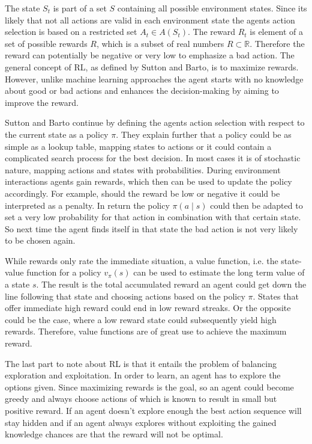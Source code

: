 The state $S_t$ is part of a set $S$ containing all possible environment states.
Since its likely that not all actions are valid in each environment state
the agents action selection is based on a restricted set $A_t\in A(S_t)$.
The reward $R_t$ is element of a set of possible rewards $R$, which is a subset of real
numbers $R \subset \mathbb{R}$. Therefore the reward can potentially be negative or very
low to emphasize a bad action. The general concept of RL, as defined by Sutton and
Barto, is to maximize rewards. However, unlike machine learning approaches
the agent starts with no knowledge about good or bad actions and enhances the
decision-making by aiming to improve the reward.

Sutton and Barto continue by defining the agents action selection with
respect to the current state as a policy $\pi$.
They explain further that a policy could be as simple as a lookup table, mapping
states to actions or it could contain a complicated search process for the best
decision. In most cases it is of stochastic nature, mapping actions and states with
probabilities. During environment interactions agents gain rewards, which then can be
used to update the policy accordingly. For example, should the reward
be low or negative it could be interpreted as a penalty. In return the policy $\pi(a \mid s)$
could then be adapted to set a very low probability for that action in combination with
that certain state. So next time the agent finds itself in that state the bad action is
not very likely to be chosen again.

While rewards only rate the immediate situation, a value function, i.e. the state-value
function for a policy $v_{\pi}(s)$ can be
used to estimate the long term value of a state $s$. The result is the total accumulated
reward an agent could get down the line following that state and choosing actions
based on the policy $\pi$. States that offer immediate high reward could end in
low reward streaks. Or the opposite could be the case, where a low reward state
could subsequently yield high rewards. Therefore, value functions are of great use
to achieve the maximum reward.

The last part to note about RL is that it entails the problem of balancing
exploration and exploitation. In order to learn, an agent has to explore the options
given. Since maximizing rewards is the goal, so an agent could become greedy
and always choose actions of which is known to result in small but positive reward.
If an agent doesn't explore enough the best action sequence will stay hidden and
if an agent always explores without exploiting the gained knowledge chances are that the
reward will not be optimal.

